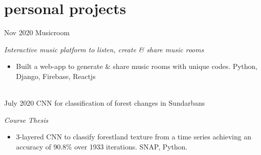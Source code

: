 \section*{personal projects}
\begin{entrylist}
	\entry
	{Nov 2020}
	{Musicroom}{}
	{\emph{Interactive music platform to listen, create \& share music rooms}
		\begin{itemize}
			\item Built a web-app to generate \& share music rooms with unique codes. Python, Django, Firebase, Reactjs
		\end{itemize}
	}
	\ \\
	\entry
	{July 2020}
	{CNN for classification of forest changes in Sundarbans}
	{}
	{\emph{Course Thesis}
		\begin{itemize}
			\item 3-layered CNN to classify forestland texture from a time series achieving an accuracy of 90.8\% over 1933 iterations. SNAP, Python.
		\end{itemize}
	}


\end{entrylist}